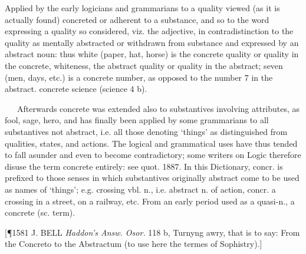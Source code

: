 \begin{description}[wide, labelwidth=!, labelindent=0pt]
\begin{myenumerate}
 Applied by the early logicians and grammarians to a quality viewed (as it is actually found) concreted or adherent to a substance, and so to the word expressing a quality so considered, viz. the adjective, in contradistinction to the quality as mentally abstracted or withdrawn from substance and expressed by an abstract noun: thus white (paper, hat, horse) is the concrete quality or quality in the concrete, whiteness, the abstract quality or quality in the abstract; seven (men, days, etc.) is a concrete number, as opposed to the number 7 in the abstract. concrete science (science 4 b).

   Afterwards concrete was extended also to substantives involving attributes, as fool, sage, hero, and has finally been applied by some grammarians to all substantives not abstract, i.e. all those denoting ‘things’ as distinguished from qualities, states, and actions. The logical and grammatical uses have thus tended to fall asunder and even to become contradictory; some writers on Logic therefore disuse the term concrete entirely: see quot. 1887. In this Dictionary, concr. is prefixed to those senses in which substantives originally abstract come to be used as names of ‘things’; e.g. crossing vbl. n., i.e. abstract n. of action, concr. a crossing in a street, on a railway, etc.
From an early period used as a quasi-n., a concrete (sc. term).

[\P 1581 J. BELL  \textit{Haddon's Answ. Osor.} 118 b, Turnyng awry, that is to say: From the Concreto to the Abstractum (to use here the termes of Sophistry).]


\end{myenumerate}
\end{description}
